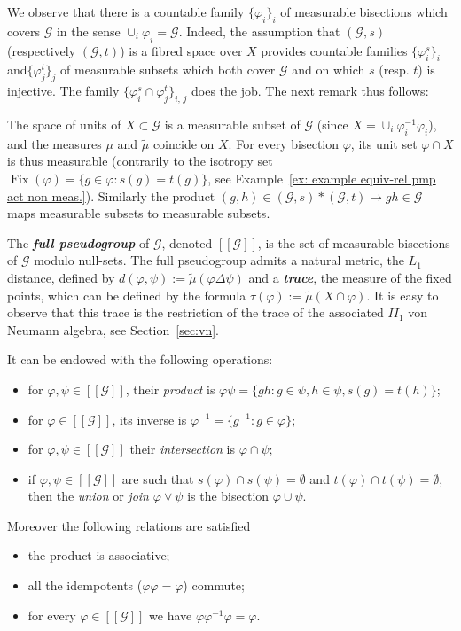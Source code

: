 \documentclass[AHL,Unicode,longabstracts,published]{cedram}
\newcommand{\defin}[1]{\textbf{\emph{#1}}}
\newcommand{\cg}{\mathcal{G}}
\DeclareMathOperator{\Fix}{Fix}
\newcommand{\ph}{\varphi}
\begin{document}
We observe that there is a countable family $\{\ph_i\}_i$ of measurable bisections which covers $\cg$ in the sense $\cup_i \ph_i=\cg$. Indeed, the assumption that $(\cg,s)$ (respectively $(\cg,t)$) is a fibred space over $X$ provides countable families $\{\ph_i^s\}_i$ and$\{\ph_j^t\}_j$ of measurable subsets which both cover $\cg$ and on which $s$ (resp. $t$) is injective. The family $\{\ph_i^s\cap \ph_j^t\}_{i,\,j}$ does the job. The next remark thus follows:
\begin{rema}\label{rem: X is measurable in G}
The space of units of $X\subset \cg$ is a measurable subset of $\cg$ (since $X = \cup_i \ph_i^{-1} \ph_i$), and the measures $\mu$ and $\widetilde \mu$ coincide on $X$. For every bisection $\ph$, its unit set $\ph\cap X$ is thus measurable (contrarily to the isotropy set $\Fix(\ph)=\{g\in \ph: s(g)=t(g)\}$, see Example~\ref{ex: example equiv-rel pmp act non meas.}). Similarly the product $(g,h)\in (\cg,s)\ast(\cg,t)\mapsto gh\in\cg$ maps measurable subsets to measurable subsets.
\end{rema}

The \defin{full pseudogroup} of $\cg$, denoted $[[\cg]]$, is the set of measurable bisections of $\cg$ modulo null-sets. The full pseudogroup admits a natural metric, the $L_1$ distance, defined by $d(\ph,\psi) := \widetilde \mu(\ph \Delta \psi)$ and a \defin{trace}, the measure of the fixed points, which can be defined by the formula $\tau(\ph):=\widetilde \mu(X\cap \ph)$. It is easy to observe that this trace is the restriction of the trace of the associated $II_1$ von Neumann algebra, see Section~\ref{sec:vn}.

It can be endowed with the following operations:
\begin{itemize}
\item for $\ph,\psi \in [[\cg]]$, their \emph{product} is $\ph\psi=\{gh:g\in \psi,h \in \psi, s(g)=t(h)\}$;
\item for $\ph\in [[\cg]]$, its inverse is $\ph^{-1}= \{g^{-1}: g \in \ph\}$;
\item for $\ph,\psi \in [[\cg]]$ their \emph{intersection} is $\ph\cap \psi$;
\item if $\ph,\psi\in [[\cg]]$ are such that $s(\ph) \cap s(\psi) = \emptyset$ and $t(\ph) \cap t(\psi)=\emptyset$, then the \emph{union} or \emph{join} $\ph\vee \psi$ is the bisection $\ph \cup \psi$.
\end{itemize}
Moreover the following relations are satisfied
\begin{itemize}
\item the product is associative;
\item all the idempotents ($\ph \ph=\ph$) commute;
\item for every $\ph\in [[\cg]]$ we have $\ph \ph^{-1}\ph=\ph$.
\end{itemize}
\end{document}
